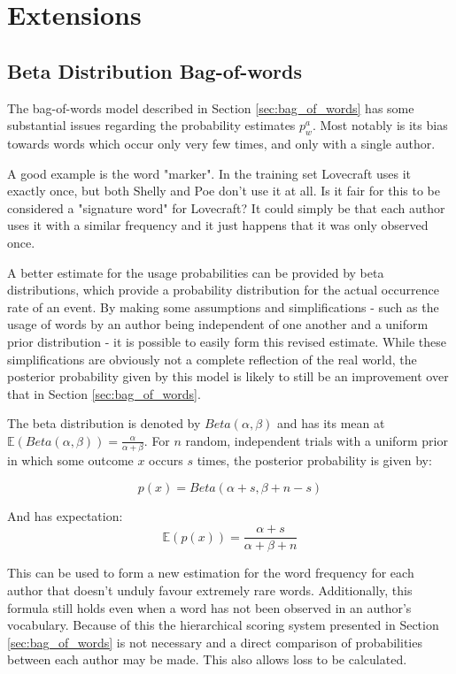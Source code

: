 \section{Extensions}
\label{sec:extensions}
  
\subsection{Beta Distribution Bag-of-words}
\label{sec:bow_beta}
The bag-of-words model described in Section \ref{sec:bag_of_words} has some substantial issues regarding the probability estimates $p_w^a$. Most notably is its bias towards words which occur only very few times, and only with a single author.

A good example is the word "marker". In the training set Lovecraft uses it exactly once, but both Shelly and Poe don't use it at all. Is it fair for this to be considered a "signature word" for Lovecraft? It could simply be that each author uses it with a similar frequency and it just happens that it was only observed once.

A better estimate for the usage probabilities can be provided by beta distributions, which provide a probability distribution for the actual occurrence rate of an event. By making some assumptions and simplifications - such as the usage of words by an author being independent of one another and a uniform prior distribution - it is possible to easily form this revised estimate. While these simplifications are obviously not a complete reflection of the real world, the posterior probability given by this model is likely to still be an improvement over that in Section \ref{sec:bag_of_words}.

The beta distribution is denoted by $Beta(\alpha , \beta)$ and has its mean at $\mathbb{E}(Beta(\alpha, \beta)) = \frac{\alpha}{\alpha + \beta}$. For $n$ random, independent trials with a uniform prior in which some outcome $x$ occurs $s$ times, the posterior probability is given by:

\begin{equation*}
p(x) = Beta(\alpha + s, \beta + n - s)
\end{equation*}

And has expectation:
\begin{equation*}
\mathbb{E}(p(x)) = \frac{\alpha+s}{\alpha + \beta + n}
\end{equation*}

This can be used to form a new estimation for the word frequency for each author that doesn't unduly favour extremely rare words. Additionally, this formula still holds even when a word has not been observed in an author's vocabulary. Because of this the hierarchical scoring system presented in Section \ref{sec:bag_of_words} is not necessary and a direct comparison of probabilities between each author may be made. This also allows loss to be calculated.

